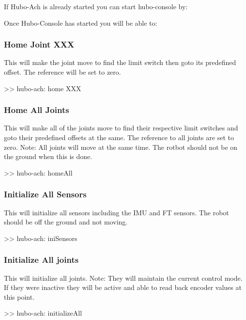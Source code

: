 If Hubo-Ach is already started you can start hubo-console by:




Once Hubo-Console has started you will be able to:


\subsubsection{Home Joint XXX}
This will make the joint move to find the limit switch then goto its predefined offset. The reference will be set to zero.
\begin{code}
>> hubo-ach: home XXX
\end{code}




\subsubsection{Home All Joints}
This will make all of the joints move to find their respective limit switches and goto their predefined offsets at the same. The reference to all joints are set to zero. Note: All joints will move at the same time. The rotbot should not be on the ground when this is done.
\begin{code}
>> hubo-ach: homeAll
\end{code}



\subsubsection{Initialize All Sensors}
This will initialize all sensors including the IMU and FT sensors. The robot should be off the ground and not moving.

\begin{code}
>> hubo-ach: iniSensors
\end{code}



\subsubsection{Initialize All joints}
This will initialize all joints. Note: They will maintain the current control mode. If they were inactive they will be active and able to read back encoder values at this point.
\begin{code}
>> hubo-ach: initializeAll
\end{code}

